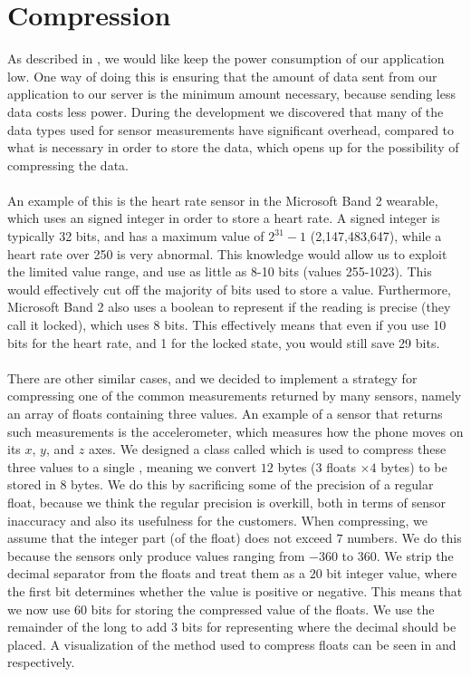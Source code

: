 
\section{Compression}
\label{sec:compression}

As described in , we would like keep the power consumption of our application low. One way of doing this is ensuring that the amount of data sent from our application to our server is the minimum amount necessary, because sending less data costs less power. During the development we discovered that many of the data types used for sensor measurements have significant overhead, compared to what is necessary in order to store the data, which opens up for the possibility of compressing the data. 
\\\\
An example of this is the heart rate sensor in the Microsoft Band 2 wearable, which uses an signed integer in order to store a heart rate. A signed integer is typically 32 bits, and has a maximum value of $2^{31} - 1$ (2,147,483,647), while a heart rate over 250 is very abnormal. This knowledge would allow us to exploit the limited value range, and use as little as 8-10 bits (values 255-1023). This would effectively cut off the majority of bits used to store a value. Furthermore, Microsoft Band 2 also uses a boolean to represent if the reading is precise (they call it locked), which uses 8 bits. This effectively means that even if you use 10 bits for the heart rate, and 1 for the locked state, you would still save 29 bits.    
\\\\
There are other similar cases, and we decided to implement a strategy for compressing one of the common measurements returned by many sensors, namely an array of floats containing three values. An example of a sensor that returns such measurements is the accelerometer, which measures how the phone moves on its $x$, $y$, and $z$ axes. We designed a class called  which is used to compress these three values to a single , meaning we convert $12$ bytes ($3$ floats $\times 4$ bytes) to be stored in $8$ bytes. We do this by sacrificing some of the precision of a regular float, because we think the regular precision is overkill, both in terms of sensor inaccuracy and also its usefulness for the customers. When compressing, we assume that the integer part (of the float) does not exceed $7$ numbers. We do this because the sensors only produce values ranging from $-360$ to $360$. We strip the decimal separator from the floats and treat them as a $20$ bit integer value, where the first bit determines whether the value is positive or negative. This means that we now use $60$ bits for storing the compressed value of the floats. We use the remainder of the long to add 3 bits for representing where the decimal should be placed. A visualization of the method used to compress floats can be seen in  and  respectively.

